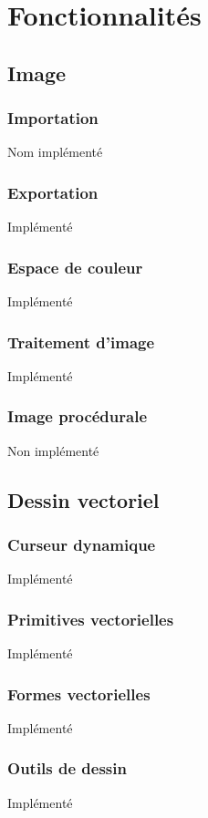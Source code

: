 \chapter{Fonctionnalités}
\label{s:fonctionnalite}

\section{Image}
\subsection{Importation}
Nom implémenté

\subsection{Exportation}
Implémenté

\subsection{Espace de couleur}
Implémenté

\subsection{Traitement d'image}
Implémenté

\subsection{Image procédurale}
Non implémenté

\section{Dessin vectoriel}
\subsection{Curseur dynamique}
Implémenté

\subsection{Primitives vectorielles}
Implémenté

\subsection{Formes vectorielles}
Implémenté

\subsection{Outils de dessin}
Implémenté

